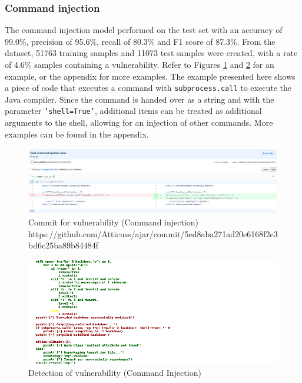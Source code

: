 \documentclass[
a4paper,
pagesize,
pdftex,
12pt,
twoside, %
BCOR=5mm, %
ngerman,
fleqn,
final,
]{scrartcl}
\begin{document}
	\subsubsection{Command injection}
	The command injection model performed on the test set with an accuracy of 99.0\%, precision of 95.6\%, recall of 80.3\% and F1 score of 87.3\%. From the dataset, 51763 training samples and 11073 test samples were created, with a rate of 4.6\% samples containing a vulnerability. Refer to Figures \ref{fig:command_injectionB} and \ref{fig:command_injectionBr} for an example, or the appendix for more examples. The example presented here shows a piece of code that executes a command with \texttt{subprocess.call} to execute the Java compiler. Since the command is handed over as a string and with the parameter \texttt{'shell=True'}, additional items can be treated as additional arguments to the shell, allowing for an injection of other commands. More examples can be found in the appendix.
	
	\begin{figure}[H]
		\centering
		\includegraphics[width=\linewidth]{Images/command_injectionB}
		\caption{Commit for vulnerability (Command injection) \newline \scriptsize{https://github.com/Atticuss/ajar/commit/5ed8aba271ad20e6168f2e3bd6c25ba89b84484f}}
		\label{fig:command_injectionB}
	\end{figure}
	\begin{figure}[H]
		\centering
		\includegraphics[width=\linewidth]{Images/command_injectionBr}
		\caption{Detection of vulnerability (Command Injection)}
		\label{fig:command_injectionBr}
	\end{figure}
	
\end{document}
